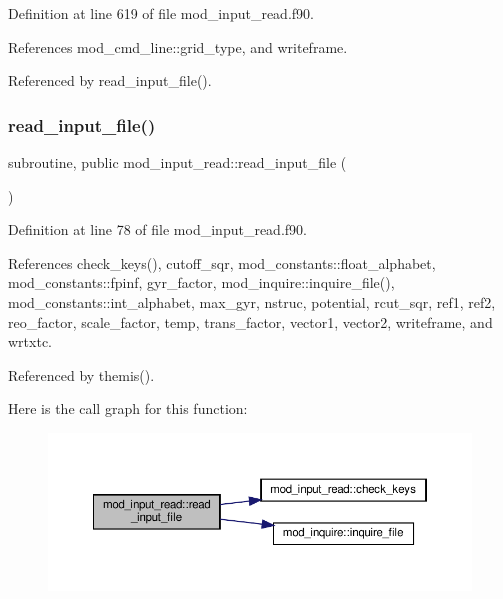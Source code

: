Definition at line 619 of file mod\+\_\+input\+\_\+read.\+f90.



References mod\+\_\+cmd\+\_\+line\+::grid\+\_\+type, and writeframe.



Referenced by read\+\_\+input\+\_\+file().

\mbox{\label{namespacemod__input__read_ae27abd188ee109221a29ed77b68fb6d9}} 
\subsubsection{\texorpdfstring{read\+\_\+input\+\_\+file()}{read\_input\_file()}}
{\footnotesize\ttfamily subroutine, public mod\+\_\+input\+\_\+read\+::read\+\_\+input\+\_\+file (\begin{DoxyParamCaption}{ }\end{DoxyParamCaption})}



Definition at line 78 of file mod\+\_\+input\+\_\+read.\+f90.



References check\+\_\+keys(), cutoff\+\_\+sqr, mod\+\_\+constants\+::float\+\_\+alphabet, mod\+\_\+constants\+::fpinf, gyr\+\_\+factor, mod\+\_\+inquire\+::inquire\+\_\+file(), mod\+\_\+constants\+::int\+\_\+alphabet, max\+\_\+gyr, nstruc, potential, rcut\+\_\+sqr, ref1, ref2, reo\+\_\+factor, scale\+\_\+factor, temp, trans\+\_\+factor, vector1, vector2, writeframe, and wrtxtc.



Referenced by themis().

Here is the call graph for this function\+:
\nopagebreak
\begin{figure}[H]
\begin{center}
\leavevmode
\includegraphics[width=350pt]{namespacemod__input__read_ae27abd188ee109221a29ed77b68fb6d9_cgraph}
\end{center}
\end{figure}


